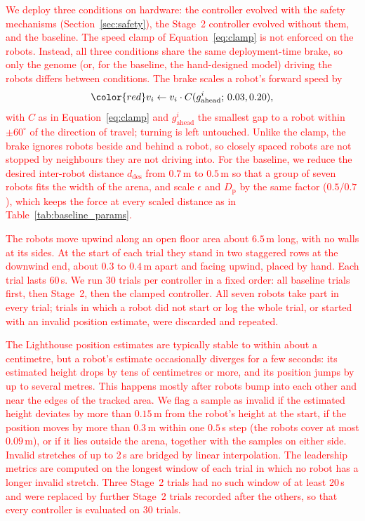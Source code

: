 \documentclass[runningheads]{llncs}
\newcommand{\rev}[1]{\textcolor{red}{#1}}
\begin{document}
\rev{We deploy three conditions on hardware: the controller evolved with the safety mechanisms (Section~\ref{sec:safety}), the Stage~2 controller evolved without them, and the baseline.} \rev{The speed clamp of Equation~\ref{eq:clamp} is not enforced on the robots.} \rev{Instead, all three conditions share the same deployment-time brake, so only the genome (or, for the baseline, the hand-designed model) driving the robots differs between conditions.} \rev{The brake scales a robot's forward speed by}
\begin{equation}
\color{red}v_i \leftarrow v_i \cdot C(g^i_{\text{ahead}};\,0.03, 0.20),
\label{eq:brake}
\end{equation}
\rev{with $C$ as in Equation~\ref{eq:clamp} and $g^i_{\text{ahead}}$ the smallest gap to a robot within $\pm 60^\circ$ of the direction of travel; turning is left untouched.} \rev{Unlike the clamp, the brake ignores robots beside and behind a robot, so closely spaced robots are not stopped by neighbours they are not driving into.} \rev{For the baseline, we reduce the desired inter-robot distance $d_{\text{des}}$ from $0.7$\,m to $0.5$\,m so that a group of seven robots fits the width of the arena, and scale $\epsilon$ and $D_{\text{p}}$ by the same factor ($0.5/0.7$), which keeps the force at every scaled distance as in Table~\ref{tab:baseline_params}.}

\rev{The robots move upwind along an open floor area about $6.5$\,m long, with no walls at its sides.} \rev{At the start of each trial they stand in two staggered rows at the downwind end, about $0.3$ to $0.4$\,m apart and facing upwind, placed by hand.} \rev{Each trial lasts 60\,s.} \rev{We run 30 trials per controller in a fixed order: all baseline trials first, then Stage~2, then the clamped controller.} \rev{All seven robots take part in every trial; trials in which a robot did not start or log the whole trial, or started with an invalid position estimate, were discarded and repeated.}

\rev{The Lighthouse position estimates are typically stable to within about a centimetre, but a robot's estimate occasionally diverges for a few seconds: its estimated height drops by tens of centimetres or more, and its position jumps by up to several metres.} \rev{This happens mostly after robots bump into each other and near the edges of the tracked area.} \rev{We flag a sample as invalid if the estimated height deviates by more than $0.15$\,m from the robot's height at the start, if the position moves by more than $0.3$\,m within one $0.5$\,s step (the robots cover at most $0.09$\,m), or if it lies outside the arena, together with the samples on either side.} \rev{Invalid stretches of up to 2\,s are bridged by linear interpolation.} \rev{The leadership metrics are computed on the longest window of each trial in which no robot has a longer invalid stretch.} \rev{Three Stage~2 trials had no such window of at least 20\,s and were replaced by further Stage~2 trials recorded after the others, so that every controller is evaluated on 30 trials.}
\end{document}
